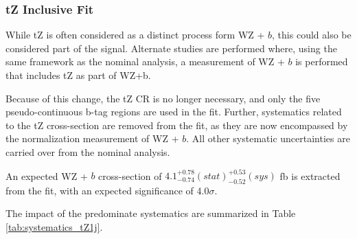 
\subsubsection{tZ Inclusive Fit}
\label{sec:inc_tZ}

While tZ is often considered as a distinct process form WZ + $b$, this could also be considered part of the signal. Alternate studies are performed where, using the same framework as the nominal analysis, a measurement of WZ + $b$ is performed that includes tZ as part of WZ+b. 

Because of this change, the tZ CR is no longer necessary, and only the five pseudo-continuous b-tag regions are used in the fit. Further, systematics related to the tZ cross-section are removed from the fit, as they are now encompassed by the normalization measurement of WZ + $b$. All other systematic uncertainties are carried over from the nominal analysis.



An expected WZ + $b$ cross-section of $4.1^{+0.78}_{-0.74} (stat)^{+0.53}_{-0.52}(sys)$ fb is extracted from the fit, with an expected significance of 4.0$\sigma$.

The impact of the predominate systematics are summarized in Table \ref{tab:systematics_tZ1j}.

